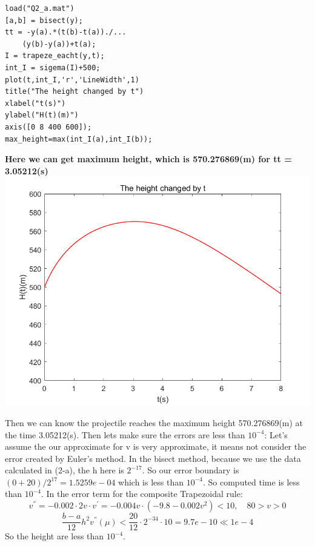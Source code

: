 \documentclass{article}
\begin{document}
\begin{flushleft}
\begin{enumerate}
\begin{framed}
\begin{multicols}{2}
\begin{verbatim}
load("Q2_a.mat")
[a,b] = bisect(y);
tt = -y(a).*(t(b)-t(a))./...
    (y(b)-y(a))+t(a);
I = trapeze_eacht(y,t);
int_I = sigema(I)+500;
plot(t,int_I,'r','LineWidth',1)
title("The height changed by t")
xlabel("t(s)")
ylabel("H(t)(m)")
axis([0 8 400 600]);
max_height=max(int_I(a),int_I(b));
\end{verbatim}
\textbf{Here we can get maximum height, which is 570.276869(m) for tt = 3.05212(s)}
\columnbreak
\includegraphics[width={\linewidth}]{Q2_c_h.png}
\end{multicols}
Then we can know the projectile reaches the maximum height 570.276869(m) at the time 3.05212(s).
\newline
Then lets make sure the errors are less than \(10^{-4}\):
\newline
Let's assume the our approximate for v is very approximate, it means not consider the error created by Euler's method.
In the bisect method, because we use the data calculated in (2-a), the h here is \(2^{-17}\). So our error boundary is \((0+20)/2^{17}=1.5259e-04\) which is less than \(10^{-4}\).
So computed time is less than \(10^{-4}\).
In the error term for the composite Trapezoidal rule:
\[
v^{''} = -0.002 \cdot 2v\cdot v^{'}=-0.004v\cdot (-9.8-0.002v^{2})< 10, \quad 80> v> 0
\]
\[
\frac{b-a}{12}h^{2}v^{''}(\mu) < \frac{20}{12} \cdot 2^{-34} \cdot 10 = 9.7e-10 \ll 1e-4
\]
\newline
So the height are less than \(10^{-4}\).

\newpage


\end{framed}
\end{enumerate}
\end{flushleft}
\end{document}

